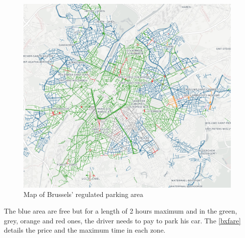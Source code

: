 \documentclass[12pt,a4paper,oneside]{book}
\begin{document}
\begin{figure}[h]
\centering
\caption{Map of Brussels' regulated parking area}
\label{bxmap}
\includegraphics[keepaspectratio=true,width=\textwidth-2cm]{images/bxpark.png}
\end{figure}


The blue area are free but for a length of 2 hours maximum and in the green, grey, orange and red ones, the driver needs to pay to park his car. The \autoref{bxfare} details the price and the maximum time in each zone.\\
\end{document}
